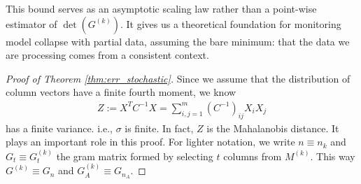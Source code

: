 \documentclass{article}
\theoremstyle{plain}
\theoremstyle{definition}
\theoremstyle{remark}
\begin{document}
This bound serves as an asymptotic scaling law rather than a point-wise estimator of $\det(G^{(k)})$. It gives us a theoretical foundation for monitoring model collapse with partial data, assuming the bare minimum: that the data we are processing comes from a consistent context.

\begin{proof}[Proof of Theorem \ref{thm:err_stochastic}]
    Since we assume that the distribution of column vectors have a finite fourth moment, we know
    \begin{align} \label{eq:app:thm3:z}
        Z:=X^TC^{-1}X = \sum_{i,j=1}^m (C^{-1})_{ij}X_iX_j
    \end{align}
has a finite variance. i.e., $\sigma$ is finite. In fact, $Z$ is the Mahalanobis distance. It plays an important role in this proof. For lighter notation, we write $n \equiv n_k$ and  $G_t \equiv G_t^{(k)}$ the gram matrix formed by selecting $t$ columns from $M^{(k)}$. This way $G^{(k)} \equiv G_n$ and $G^{(k)}_A \equiv G_{n_A}$.


\end{proof}
\end{document}

